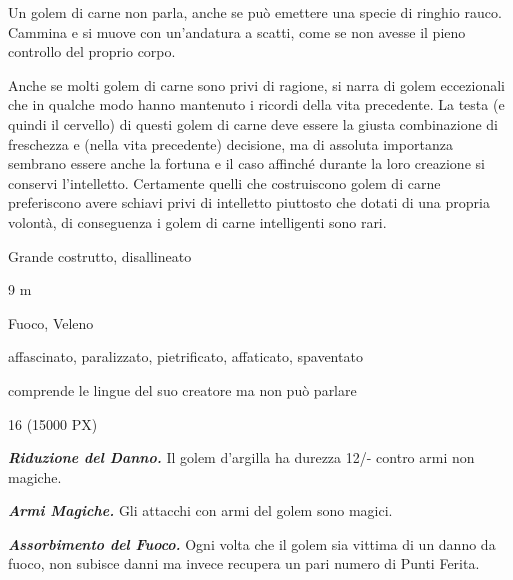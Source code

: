 \begin{multicols}{2}
{Un golem di carne non parla, anche se può emettere una specie di ringhio rauco. Cammina e si muove con un'andatura a scatti, come se non avesse il pieno controllo del proprio corpo.

Anche se molti golem di carne sono privi di ragione, si narra di golem eccezionali che in qualche modo hanno mantenuto i ricordi della vita precedente. La testa (e quindi il cervello) di questi golem di carne deve essere la giusta combinazione di freschezza e (nella vita precedente) decisione, ma di assoluta importanza sembrano essere anche la fortuna e il caso affinché durante la loro creazione si conservi l'intelletto. Certamente quelli che costruiscono golem di carne preferiscono avere schiavi privi di intelletto piuttosto che dotati di una propria volontà, di conseguenza i golem di carne intelligenti sono rari.

\begin{description}[noitemsep, topsep=0pt, parsep=0pt, partopsep=0pt, itemsep=1pt, leftmargin=2.35cm,  labelwidth=2.2cm, itemindent=0cm, listparindent=0pt] %
\setlength{\baselineskip}{10pt}
\item[\textbf{Taglia/Tipo}] Grande costrutto, disallineato
\item[\textbf{Caratt.}] 
\item[\textbf{Punti Ferita}] 
\item[\textbf{Movimento}] 9 m
\item[\textbf{Tiri Salvez.}] 
\item[\textbf{Imm. Danni}] Fuoco, Veleno
\item[\textbf{Immunità}] affascinato, paralizzato, pietrificato, affaticato, spaventato
\item[\textbf{Sensi}] 
\item[\textbf{Linguaggi}] comprende le lingue del suo creatore ma non può parlare
\item[\textbf{Sfida}] 16 (15000 PX)
\end{description}
\smallskip

\emph{\textbf{Riduzione del Danno.}} Il golem d'argilla ha durezza 12/- contro armi non magiche.

\emph{\textbf{Armi Magiche.}} Gli attacchi con armi del golem sono magici.

\emph{\textbf{Assorbimento del Fuoco.}} Ogni volta che il golem sia vittima di un danno da fuoco, non subisce danni ma invece recupera un pari numero di Punti Ferita.

}
\end{multicols}
